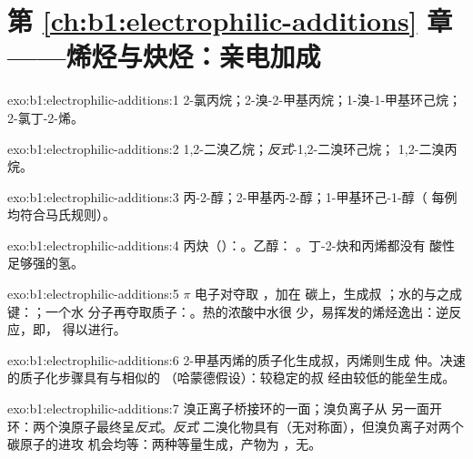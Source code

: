 \section*{第 \ref{ch:b1:electrophilic-additions} 章——烯烃与炔烃：亲电加成}

\begin{solution}{exo:b1:electrophilic-additions:1}
2-氯丙烷；2-溴-2-甲基丙烷；1-溴-1-甲基环己烷；
2-氯丁-2-烯。
\end{solution}

\begin{solution}{exo:b1:electrophilic-additions:2}
1,2-二溴乙烷；\textit{反式}-1,2-二溴环己烷；
1,2-二溴丙烷。
\end{solution}

\begin{solution}{exo:b1:electrophilic-additions:3}
丙-2-醇；2-甲基丙-2-醇；1-甲基环己-1-醇（
每例均符合马氏规则）。
\end{solution}

\begin{solution}{exo:b1:electrophilic-additions:4}
丙炔（）：。乙醇：
。丁-2-炔和丙烯都没有
酸性足够强的氢。
\end{solution}

\begin{solution}{exo:b1:electrophilic-additions:5}
$\pi$ 电子对夺取 ，加在  碳上，生成叔
；水的与之成键：；一个水
分子再夺取质子：。热的浓酸中水很
少，易挥发的烯烃逸出：逆反应，即，
得以进行。
\end{solution}

\begin{solution}{exo:b1:electrophilic-additions:6}
2-甲基丙烯的质子化生成叔，丙烯则生成
仲。决速的质子化步骤具有与相似的
（哈蒙德假设）：较稳定的叔
经由较低的能垒生成。
\end{solution}

\begin{solution}{exo:b1:electrophilic-additions:7}
溴正离子桥接环的一面；溴负离子从
另一面开环：两个溴原子最终呈\textit{反式}。\textit{反式}
二溴化物具有（无对称面），但溴负离子对两个碳原子的进攻
机会均等：两种等量生成，产物为
，无。
\end{solution}

